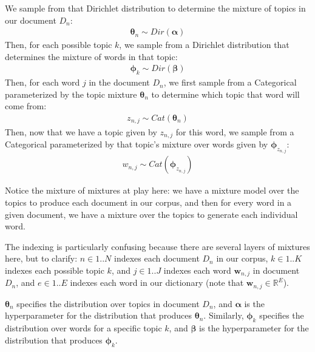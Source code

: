 
We sample from that Dirichlet distribution to determine the mixture of topics in our document $D_n$:
\begin{align*}
    \boldsymbol{\theta}_n \sim Dir(\boldsymbol{\alpha})
\end{align*}
Then, for each possible topic $k$, we sample from a Dirichlet distribution that determines the mixture of words in that topic:
\begin{align*}
    \boldsymbol{\phi}_k \sim Dir(\boldsymbol{\beta})
\end{align*}
Then, for each word $j$ in the document $D_n$, we first sample from a Categorical parameterized by the topic mixture $\boldsymbol{\theta}_n$ to determine which topic that word will come from:
\begin{align*}
    z_{n, j} \sim Cat(\boldsymbol{\theta}_n)
\end{align*}
Then, now that we have a topic given by $z_{n, j}$ for this word, we sample from a Categorical parameterized by that topic's mixture over words given by $\boldsymbol{\phi}_{z_{n, j}}$:
\begin{align*}
    w_{n, j} \sim Cat(\boldsymbol{\phi}_{z_{n, j}})
\end{align*}

Notice the mixture of mixtures at play here: we have a mixture model over the topics to produce each document in our corpus, and then for every word in a given document, we have a mixture over the topics to generate each individual word.

The indexing is particularly confusing because there are several layers of mixtures here, but to clarify: $n \in 1..N$ indexes each document $D_n$ in our corpus, $k \in 1..K$ indexes each possible topic $k$, and $j \in 1..J$ indexes each word $\textbf{w}_{n,j}$ in document $D_n$, and $e \in 1..E$ indexes each word in our dictionary (note that $\textbf{w}_{n,j} \in \mathbb{R}^{E}$).

$\boldsymbol{\theta}_n$ specifies the distribution over topics in document $D_n$, and $\boldsymbol{\alpha}$ is the hyperparameter for the distribution that produces $\boldsymbol{\theta}_n$. Similarly, $\boldsymbol{\phi}_k$ specifies the distribution over words for a specific topic $k$, and $\boldsymbol{\beta}$ is the hyperparameter for the distribution that produces $\boldsymbol{\phi}_k$.


